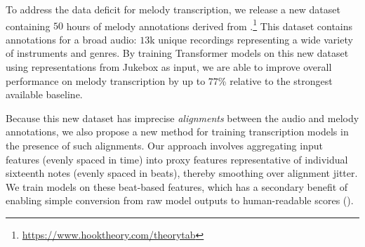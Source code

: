 
To address the data deficit for melody transcription, 
we release a new dataset containing $50$ hours of melody annotations 
derived 
from \hooktheory.\footnote{\url{https://www.hooktheory.com/theorytab}} 
This dataset contains annotations for a broad audio: 
$13$k unique recordings representing a wide variety of instruments and genres. 
By training Transformer models on this new dataset using representations from Jukebox as input, we are able to improve overall performance on melody transcription by 
up to $77$\% 
relative to the strongest available baseline. 

Because this new dataset has imprecise \emph{alignments} between the audio and melody annotations,
we also propose a new method for training transcription models in the presence of such alignments.
Our approach 
involves aggregating input features (evenly spaced in time) into proxy features representative of individual sixteenth notes (evenly spaced in beats), 
thereby smoothing over alignment jitter. 
We train models on these beat-based features, 
which has a secondary benefit of enabling simple conversion from raw model outputs to human-readable scores ().

